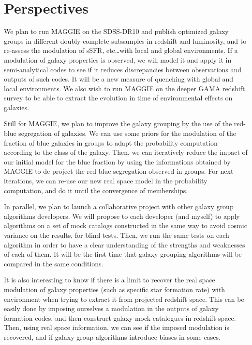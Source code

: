 \section{Perspectives}
\label{sec:perspectives}

We plan to run MAGGIE on the SDSS-DR10 and publish optimized galaxy groups in
different doubly complete subsamples in redshift and luminosity, and to
re-assess the modulation of sSFR, etc\ldots with local and global environments.
If a modulation of galaxy properties is observed, we will model it and apply it
in semi-analytical codes to see if it reduces discrepancies between
observations and outputs of such codes. It will be a new measure of quenching
with global and local environments. We also wish to run MAGGIE on the deeper
GAMA redshift survey to be able to extract the evolution in time of
environmental effects on galaxies.

Still for MAGGIE, we plan to improve the galaxy grouping by the use of the
red-blue segregation of galaxies. We can use some priors for the modulation of
the fraction of blue galaxies in groups to adapt the probability computation
according to the class of the galaxy. Then, we can iteratively reduce the
impact of our initial model for the blue fraction by using the informations
obtained by MAGGIE to de-project the red-blue segregation observed in groups.
For next iterations, we can re-use our new real space model in the probability
computation, and do it until the convergence of memberships.

In parallel, we plan to launch a collaborative project with other galaxy group
algorithms developers. We will propose to each developer (and myself) to apply
algorithms on a set of mock catalogs constructed in the same way to avoid
cosmic variance on the results, for blind tests. Then, we run the same tests on
each algorithm in order to have a clear understanding of the strengths and
weaknesses of each of them. It will be the first time that galaxy grouping
algorithms will be compared in the same conditions.

It is also interesting to know if there is a limit to recover the real space
modulation of galaxy properties (such as specific star formation rate) with
environment when trying to extract it from projected redshift space. This can
be easily done by imposing ourselves a modulation in the outputs of galaxy
formation codes, and then construct galaxy mock catalogues in redshift space.
Then, using real space information, we can see if the imposed modulation is
recovered, and if galaxy group algorithms introduce biases in some cases.

